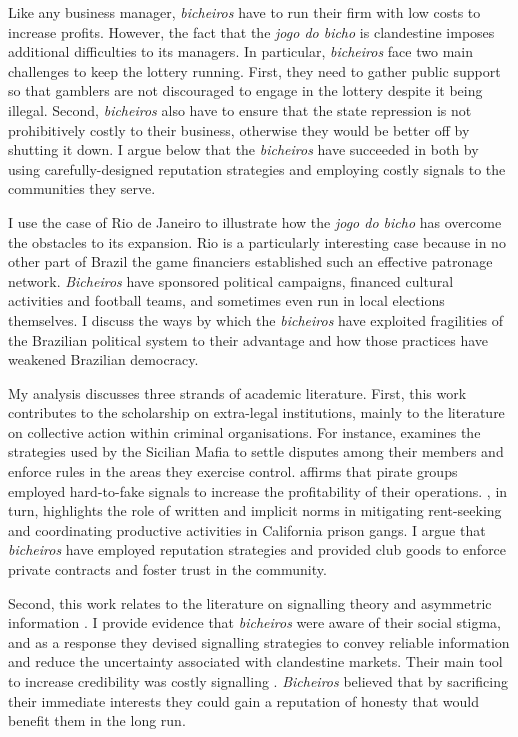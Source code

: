 \documentclass[a4paper,12pt]{article}
\begin{document}
Like any business manager, \textit{bicheiros} have to run their firm with low costs to increase profits. However, the fact that the \textit{jogo do bicho} is clandestine imposes additional difficulties to its managers. In particular, \textit{bicheiros} face two main challenges to keep the lottery running. First, they need to gather public support so that gamblers are not discouraged to engage in the lottery despite it being illegal. Second, \textit{bicheiros} also have to ensure that the state repression is not prohibitively costly to their business, otherwise they would be better off by shutting it down. I argue below that the \textit{bicheiros} have succeeded in both by using carefully-designed reputation strategies and employing costly signals to the communities they serve. 

I use the case of Rio de Janeiro to illustrate how the \textit{jogo do bicho} has overcome the obstacles to its expansion. Rio is a particularly interesting case because in no other part of Brazil the game financiers established such an effective patronage network. \textit{Bicheiros} have sponsored political campaigns, financed cultural activities and football teams, and sometimes even run in local elections themselves. I discuss the ways by which the \textit{bicheiros} have exploited fragilities of the Brazilian political system to their advantage and how those practices have weakened Brazilian democracy.   

My analysis discusses three strands of academic literature. First, this work contributes to the scholarship on extra-legal institutions, mainly to the literature on collective action within criminal organisations. For instance, \citet{gambetta1996sicilian} examines the strategies used by the Sicilian Mafia to settle disputes among their members and enforce rules in the areas they exercise control. \citet{leeson2009invisible,leeson2010pirational} affirms that pirate groups employed hard-to-fake signals to increase the profitability of their operations. \citet{skarbek2011governance,skarbek2012prison,skarbek2014social}, in turn, highlights the role of written and implicit norms in mitigating rent-seeking and coordinating productive activities in California prison gangs. I argue that \textit{bicheiros} have employed reputation strategies and provided club goods to enforce private contracts and foster trust in the community. 

Second, this work relates to the literature on signalling theory and asymmetric information \citep[e.g.,][]{akerlof1970market,spence1973job}. I provide evidence that \textit{bicheiros} were aware of their social stigma, and as a response they devised signalling strategies to convey reliable information and reduce the uncertainty associated with clandestine markets. Their main tool to increase credibility was costly signalling \citep{gambetta2009codes,kimbrough2015commitment, schelling1960strategy}. \textit{Bicheiros} believed that by sacrificing their immediate interests they could gain a reputation of honesty that would benefit them in the long run.  
\end{document}

